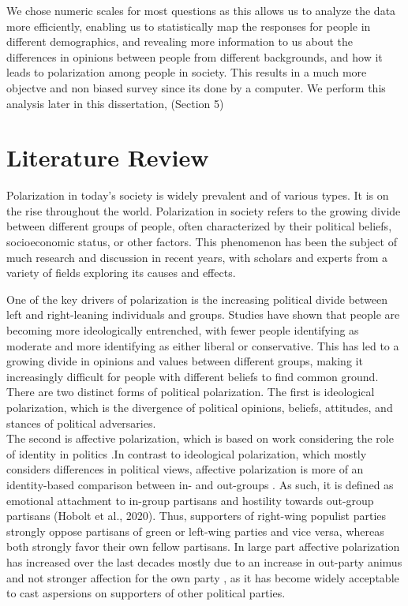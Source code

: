 \documentclass{article}
\begin{document}
We chose numeric scales for most questions as this allows us to analyze the data more efficiently, enabling us to statistically map the responses for people in different demographics, and revealing more information to us about the differences in opinions between people from different backgrounds, and how it leads to polarization among people in society. This results in a much more objectve and non biased survey since its done by a computer.
We perform this analysis later in this dissertation, (Section 5)

\newpage    
\section{Literature Review }
Polarization in today’s society is widely prevalent and of various types. It is on the rise throughout the world. Polarization in society refers to the growing divide between different groups of people, often characterized by their political beliefs, socioeconomic status, or other factors. This phenomenon has been the subject of much research and discussion in recent years, with scholars and experts from a variety of fields exploring its causes and effects.

One of the key drivers of polarization is the increasing political divide between left and right-leaning individuals and groups. Studies have shown that people are becoming more ideologically entrenched, with fewer people identifying as moderate and more identifying as either liberal or conservative. This has led to a growing divide in opinions and values between different groups, making it increasingly difficult for people with different beliefs to find common ground.
There are two distinct forms of political polarization. The first is ideological polarization, which is the divergence of political opinions, beliefs, attitudes, and stances of political adversaries\cite{Dalton1987-ps}.\\
The second is affective polarization, which is based on work considering the role of identity in politics .In contrast to ideological polarization, which mostly considers differences in political views, affective polarization is more of an identity-based comparison between in- and out-groups \cite{Iyengar2012-dw}. As such, it is defined as emotional attachment to in-group partisans and hostility towards out-group partisans (Hobolt et al., 2020). Thus, supporters of right-wing populist parties strongly oppose partisans of green or left-wing parties and vice versa, whereas both strongly favor their own fellow partisans. In large part affective polarization has increased over the last decades mostly due to an increase in out-party animus and not stronger affection for the own party \cite{Baldassarri2008-dn}\cite{Iyengar2019-ax}, as it has become widely acceptable to cast aspersions on supporters of other political parties.
 
\end{document}
